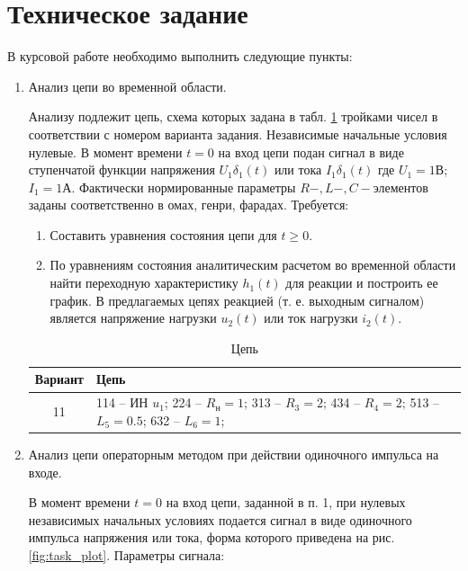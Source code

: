 \section{Техническое задание}

В курсовой работе необходимо выполнить следующие пункты:

\begin{enumerate}[label*=\arabic*.]

\item Анализ цепи во временной области. 

Анализу подлежит цепь, схема которых задана в табл. \ref{tab:circ}
тройками чисел \cite{tasks} в соответствии с номером варианта задания.
Независимые начальные условия нулевые. 
В момент времени $ t = 0 $ на вход цепи подан сигнал 
в виде ступенчатой функции 
напряжения $ U_1 \delta_1 (t) $ или
тока $ I_1 \delta_1 (t) $
где $ U_1 = 1В $; $ I_1 = 1А $. 
Фактически нормированные параметры $ R-, L-, C- $элементов 
заданы соответственно в омах, генри, фарадах. 
Требуется:

\begin{enumerate}[label*=\arabic*.]
    \item Составить уравнения состояния цепи для $ t \ge 0 $.
    \item По уравнениям состояния аналитическим расчетом во временной
    области найти переходную характеристику $ h_1(t) $
    для реакции и построить ее график. 
    В предлагаемых цепях реакцией (т. е. выходным сигналом) является
    напряжение нагрузки $ u_2(t) $ или ток нагрузки $ i_2(t) $.
\end{enumerate}

\begin{table}[H]
    \centering
    \begin{tabular}{|c|p{10cm}|}
        \hline
        Вариант & Цепь \\
        \hline
        11 & 114 -- ИН $ u_1 $;
        224 -- $ R_н = 1 $;
        313 -- $ R_3 = 2 $;
        434 -- $ R_4 = 2 $;
        513 -- $ L_5 = 0.5 $;
        632 -- $ L_6 = 1 $; \\
        \hline
    \end{tabular}
    \caption{Цепь}
    \label{tab:circ}
\end{table}

\item Анализ цепи операторным методом 
при действии одиночного импульса на входе.

В момент времени $ t = 0 $ на вход цепи, 
заданной в п. 1, при нулевых независимых начальных условиях 
подается сигнал в виде одиночного импульса
напряжения или тока, форма которого 
приведена на рис. \ref{fig:task_plot}.
Параметры сигнала:


\end{enumerate}
